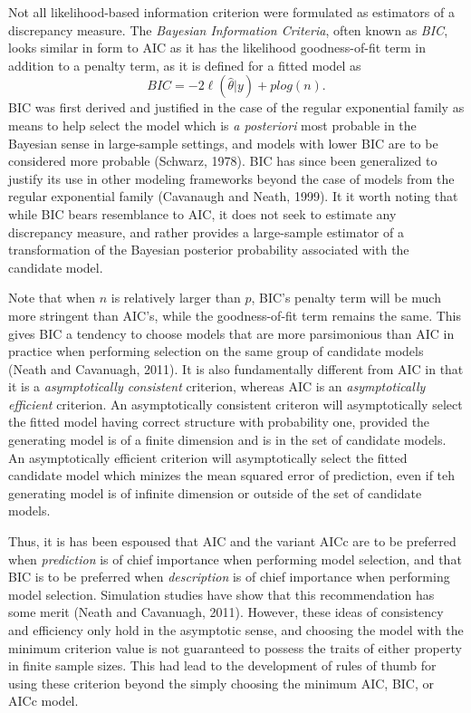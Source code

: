 		Not all likelihood-based information criterion were formulated as estimators of a discrepancy measure. The \textit{Bayesian Information Criteria}, often known as \textit{BIC}, looks similar in
		form to AIC as it has the likelihood goodness-of-fit term in addition to a penalty term, as it is defined for a fitted model as
		\begin{equation}
			BIC = -2 \ell(\hat{\theta}|y) + p log(n).
		\end{equation}
		BIC was first derived and justified in the case of the regular exponential family as means to help select the model which is \textit{a posteriori} most probable in the Bayesian sense in
		large-sample settings, and models with lower BIC are to be considered more probable (Schwarz, 1978). BIC has since been generalized to justify its use in other modeling frameworks beyond
		the case of models from the regular exponential family (Cavanaugh and Neath, 1999). It it worth noting that while BIC bears resemblance to AIC, it does not seek to estimate any discrepancy
		measure, and rather provides a large-sample estimator of a transformation of the Bayesian posterior probability associated with the candidate model.

		Note that when $n$ is relatively larger than $p$, BIC's penalty term will be much more stringent than AIC's, while the goodness-of-fit term remains the same. This gives BIC a tendency to
		choose models that are more parsimonious than AIC in practice when performing selection on the same group of candidate models (Neath and Cavanuagh, 2011). It is also fundamentally different
		from AIC in that it is a \textit{asymptotically consistent} criterion,  whereas AIC is an \textit{asymptotically efficient} criterion. An asymptotically consistent criteron will asymptotically
		select the fitted model having correct structure with probability one, provided the generating model is of a finite dimension and is in the set of candidate models. An asymptotically efficient
		criterion will asymptotically select the fitted candidate model which minizes the mean squared error of prediction, even if teh generating model is of infinite dimension or outside of the
		set of candidate models.

		Thus, it is has been espoused that AIC and the variant AICc are to be preferred when \textit{prediction} is of chief importance when performing model selection, and that BIC is to be preferred
		when \textit{description} is of chief importance when performing model selection. Simulation studies have show that this recommendation has some merit (Neath and Cavanuagh, 2011). However, these
		ideas of consistency and efficiency only hold in the asymptotic sense, and choosing the model with the minimum criterion value is not guaranteed to possess the traits of either property in
		finite sample sizes. This had lead to the development of rules of thumb for using these criterion beyond the simply choosing the minimum AIC, BIC, or AICc model.

